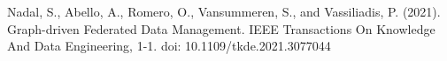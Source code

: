 \documentclass[12pt,a4paper]{report}
\begin{document}
\begin{thebibliography}{9}
Nadal, S., Abello, A., Romero, O., Vansummeren, S., and Vassiliadis, P. (2021). Graph-driven Federated Data Management. IEEE Transactions On Knowledge And Data Engineering, 1-1. doi: 10.1109/tkde.2021.3077044


\end{thebibliography}
\end{document}
